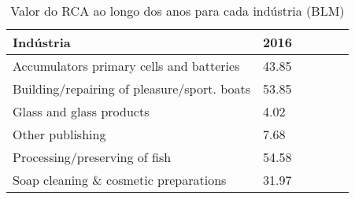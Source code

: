 \begin{table}
\centering
\caption{Valor do RCA ao longo dos anos para cada indústria (BLM)}
\label{tab:ex3-tempo-BLM}
\begin{tabular}{p{6cm}p{1.5cm}p{1.5cm}p{1.5cm}p{1.5cm}p{1.5cm}}
\toprule
                                  Indústria &  2016 \\
\midrule
   Accumulators primary cells and batteries & 43.85 \\
Building/repairing of pleasure/sport. boats & 53.85 \\
                   Glass and glass products &  4.02 \\
                           Other publishing &  7.68 \\
              Processing/preserving of fish & 54.58 \\
      Soap cleaning \& cosmetic preparations & 31.97 \\
\bottomrule
\end{tabular}
\end{table}
